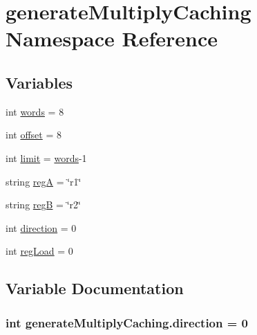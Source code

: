 \hypertarget{namespacegenerateMultiplyCaching}{\section{generate\-Multiply\-Caching Namespace Reference}
\label{namespacegenerateMultiplyCaching}
}
\subsection*{Variables}
\begin{DoxyCompactItemize}
\item 
int \hyperlink{namespacegenerateMultiplyCaching_ac3df1f039897c06d1982bc218444fa01}{words} = 8
\item 
int \hyperlink{namespacegenerateMultiplyCaching_ae17a49f63b03ec0ce742c9967dd8d837}{offset} = 8
\item 
int \hyperlink{namespacegenerateMultiplyCaching_a64538443690647d2497d626760c41562}{limit} = \hyperlink{namespacegenerateMultiplyCaching_ac3df1f039897c06d1982bc218444fa01}{words}-\/1
\item 
string \hyperlink{namespacegenerateMultiplyCaching_a472c103812db99ab3f4a433460c9d4e0}{reg\-A} = \char`\"{}r1\char`\"{}
\item 
string \hyperlink{namespacegenerateMultiplyCaching_a888dd26c3a59e11fb419a68cf3e0ca72}{reg\-B} = \char`\"{}r2\char`\"{}
\item 
int \hyperlink{namespacegenerateMultiplyCaching_a0e789f4b93614b161e7a310aee161402}{direction} = 0
\item 
int \hyperlink{namespacegenerateMultiplyCaching_a9ea896a1cc1f751747061991f2021507}{reg\-Load} = 0
\end{DoxyCompactItemize}


\subsection{Variable Documentation}
\hypertarget{namespacegenerateMultiplyCaching_a0e789f4b93614b161e7a310aee161402}{
\subsubsection[{direction}]{\setlength{\rightskip}{0pt plus 5cm}int generate\-Multiply\-Caching.\-direction = 0}}\label{namespacegenerateMultiplyCaching_a0e789f4b93614b161e7a310aee161402}


